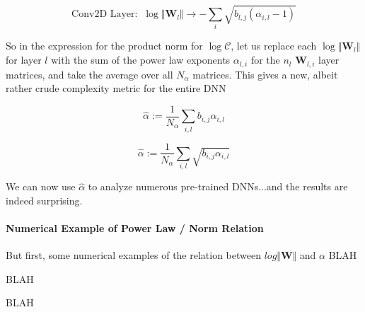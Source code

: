 $$\text{Conv2D Layer:}\;\;\log\Vert\mathbf{W}_{l}\Vert\rightarrow-\sum_{i}\sqrt{b_{l,j}(\alpha_{i,l}-1)}$$

So in the expression for the product norm for $\log\mathcal{C}$, let us replace each $\log\Vert\mathbf{W}_{l}\Vert$ for layer $l$ with the sum of the power law exponents $\alpha_{l,i}$ for the $n{_l}$ $\mathbf{W}_{l,i}$ layer matrices, and take the average over all $N_{\alpha}$  matrices.  This gives a new, albeit rather crude complexity metric for the entire DNN


$$\hat{\alpha}:=\dfrac{1}{N_{\alpha}}\sum_{i,l}b_{i,j}\alpha_{i,l}$$


$$\hat{\alpha}:=\dfrac{1}{N_{\alpha}}\sum_{i,l}\sqrt{b_{i,j}\alpha_{i,l}}$$


We can now use $\hat{\alpha}$ to analyze numerous pre-trained DNNs...and the results are indeed surprising.

\paragraph{Numerical Example of Power Law / Norm Relation}

But first, some numerical examples of the relation between $log\Vert\mathbf{W}\Vert$ and $\alpha$
BLAH

BLAH

BLAH



